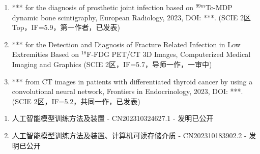 \begin{publications}
    \begin{enumerate}
        \item *** for the diagnosis of prosthetic joint infection based on \(^{99m}\)Tc-MDP dynamic bone scintigraphy, European Radiology, 2023, DOI: ***. (SCIE 2区 Top，IF=5.9，第一作者，已发表)
        \item *** for the Detection and Diagnosis of Fracture Related Infection in Low Extremities Based on \(^{18}\)F-FDG PET/CT 3D Images, Computerized Medical Imaging and Graphics (SCIE 2区，IF=5.7，导师一作，一审中)
        \item *** from CT images in patients with differentiated thyroid cancer by using a convolutional neural network, Frontiers in Endocrinology, 2023, DOI: ***. (SCIE 2区，IF=5.2，共同一作，已发表)
    \end{enumerate}

    \begin{enumerate}
        \item 人工智能模型训练方法及装置 - CN202310324627.1 - 发明已公开
        \item 人工智能模型训练方法及装置、计算机可读存储介质 - CN202310183902.2 - 发明已公开
    \end{enumerate}
\end{publications}